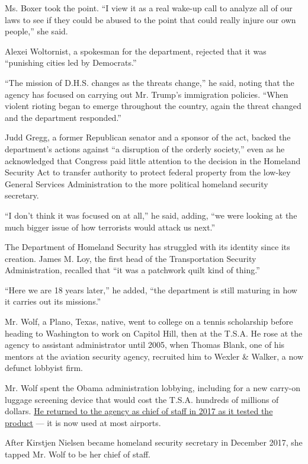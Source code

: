 Ms. Boxer took the point. ``I view it as a real wake-up call to analyze
all of our laws to see if they could be abused to the point that could
really injure our own people,'' she said.

Alexei Woltornist, a spokesman for the department, rejected that it was
``punishing cities led by Democrats.''

``The mission of D.H.S. changes as the threats change,'' he said, noting
that the agency has focused on carrying out Mr. Trump's immigration
policies. ``When violent rioting began to emerge throughout the country,
again the threat changed and the department responded.''

Judd Gregg, a former Republican senator and a sponsor of the act, backed
the department's actions against ``a disruption of the orderly
society,'' even as he acknowledged that Congress paid little attention
to the decision in the Homeland Security Act to transfer authority to
protect federal property from the low-key General Services
Administration to the more political homeland security secretary.

``I don't think it was focused on at all,'' he said, adding, ``we were
looking at the much bigger issue of how terrorists would attack us
next.''

The Department of Homeland Security has struggled with its identity
since its creation. James M. Loy, the first head of the Transportation
Security Administration, recalled that ``it was a patchwork quilt kind
of thing.''

``Here we are 18 years later,'' he added, ``the department is still
maturing in how it carries out its missions.''

Mr. Wolf, a Plano, Texas, native, went to college on a tennis
scholarship before heading to Washington to work on Capitol Hill, then
at the T.S.A. He rose at the agency to assistant administrator until
2005, when Thomas Blank, one of his mentors at the aviation security
agency, recruited him to Wexler \& Walker, a now defunct lobbyist firm.

Mr. Wolf spent the Obama administration lobbying, including for a new
carry-on luggage screening device that would cost the T.S.A. hundreds of
millions of dollars.
\href{https://www.nytimes.com/2017/04/15/us/politics/trump-appointees-potential-conflicts.html}{He
returned to the agency as chief of staff in 2017 as it tested the
product} --- it is now used at most airports.

After Kirstjen Nielsen became homeland security secretary in December
2017, she tapped Mr. Wolf to be her chief of staff.

